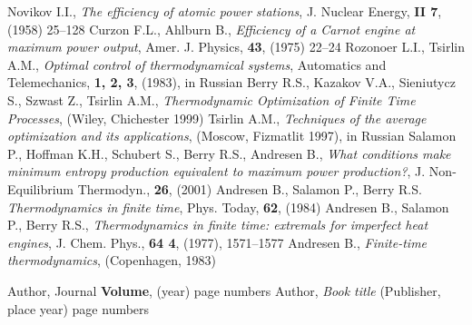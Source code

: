 \documentclass[epjST]{svjour}
\begin{document}
\begin{thebibliography}{}
Novikov I.I., \textit{The efficiency of atomic power stations}, J. Nuclear Energy, \textbf{II 7}, (1958) 25--128
Curzon F.L., Ahlburn B., \textit{Efficiency of a Carnot engine at maximum power output}, Amer. J. Physics, \textbf{43}, (1975) 22--24
Rozonoer L.I., Tsirlin A.M., \textit{Optimal control of thermodynamical systems}, Automatics and Telemechanics, \textbf{1, 2, 3}, (1983), in Russian
Berry R.S., Kazakov V.A., Sieniutycz S., Szwast Z., Tsirlin A.M., \textit{Thermodynamic Optimization of Finite Time Processes}, (Wiley, Chichester 1999)
Tsirlin A.M., \textit{Techniques of the average optimization and its applications}, (Moscow, Fizmatlit 1997), in Russian
Salamon P., Hoffman K.H., Schubert S., Berry R.S., Andresen B., \textit{What conditions make minimum entropy production equivalent to maximum power production?}, J. Non-Equilibrium Thermodyn., \textbf{26}, (2001)
Andresen B., Salamon P., Berry R.S. \textit{Thermodynamics in finite time}, Phys. Today, \textbf{62}, (1984)
Andresen B., Salamon P., Berry R.S., \textit{Thermodynamics in finite time: extremals for imperfect heat engines}, J. Chem. Phys., \textbf{64 4}, (1977), 1571--1577
Andresen B., \textit{Finite-time thermodynamics}, (Copenhagen, 1983)



Author, Journal \textbf{Volume}, (year) page numbers
Author, \textit{Book title} (Publisher, place year) page numbers
\end{thebibliography}
\end{document}
